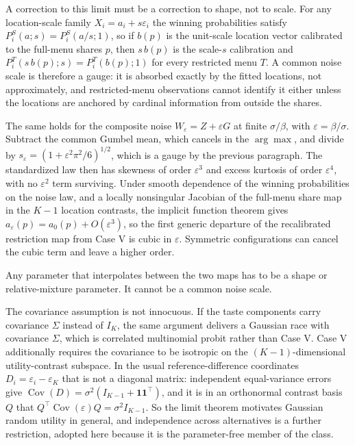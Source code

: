 \documentclass[11pt]{article}
\theoremstyle{italichead}
\begin{document}
A correction to this limit must be a correction to shape, not to scale. For any
location-scale family $X_i = a_i + s\varepsilon_i$ the winning probabilities satisfy
$P^S_i(a;s) = P^S_i(a/s;1)$, so if $b(p)$ is the unit-scale location vector calibrated to the
full-menu shares $p$, then $s\,b(p)$ is the scale-$s$ calibration and
$P^T_i(s\,b(p);s) = P^T_i(b(p);1)$ for every restricted menu $T$. A common noise scale is
therefore a gauge: it is absorbed exactly by the fitted locations, not approximately, and restricted-menu
observations cannot identify it either unless the locations are anchored by cardinal
information from outside the shares.

The same holds for the composite noise $W_\varepsilon = Z + \varepsilon G$ at finite
$\sigma/\beta$, with $\varepsilon = \beta/\sigma$. Subtract the common Gumbel mean, which
cancels in the $\arg\max$, and divide by $s_\varepsilon = (1 + \varepsilon^2 \pi^2/6)^{1/2}$,
which is a gauge by the previous paragraph. The standardized law then has skewness of order
$\varepsilon^3$ and excess kurtosis of order $\varepsilon^4$, with no $\varepsilon^2$ term
surviving. Under smooth dependence of the winning probabilities on the noise law, and a
locally nonsingular Jacobian of the full-menu share map in the $K-1$ location contrasts, the
implicit function theorem gives $a_\varepsilon(p) = a_0(p) + O(\varepsilon^3)$, so the first
generic departure of the recalibrated restriction map from Case V is cubic in $\varepsilon$.
Symmetric configurations can cancel the cubic term and leave a higher order.

Any parameter that interpolates between the two maps has to be a shape or relative-mixture
parameter. It cannot be a common noise scale.

The covariance assumption is not innocuous. If the taste
components carry covariance $\Sigma$ instead of $I_K$, the same argument delivers a Gaussian
race with covariance $\Sigma$, which is correlated multinomial probit rather than Case V.
Case V additionally requires the covariance to be isotropic on the $(K-1)$-dimensional
utility-contrast subspace. In the usual reference-difference coordinates
$D_i = \varepsilon_i - \varepsilon_K$ that is not a diagonal matrix: independent equal-variance
errors give $\operatorname{Cov}(D) = \sigma^2(I_{K-1} + \mathbf{1}\mathbf{1}^{\top})$, and it is
in an orthonormal contrast basis $Q$ that $Q^{\top}\operatorname{Cov}(\varepsilon)Q =
\sigma^2 I_{K-1}$. So the limit
theorem motivates Gaussian random utility in general, and independence across alternatives
is a further restriction, adopted here because it is the parameter-free member of the class.
\end{document}
